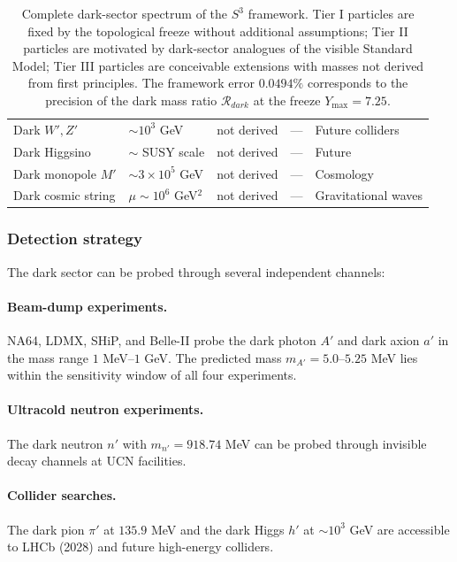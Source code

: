 \documentclass[12pt,oneside,openany]{book}
\begin{document}
\begin{table}[htbp]
\begin{tabular}{@{}p{}p{}p{}p{}p{}@{}}
Dark $W', Z'$      & $\sim 10^{3}$ GeV& not derived & ---           & Future colliders \\
Dark Higgsino      & $\sim$ SUSY scale& not derived & ---           & Future \\
Dark monopole $M'$ & $\sim 3\times 10^{5}$ GeV & not derived & --- & Cosmology \\
Dark cosmic string & $\mu\sim 10^{6}$ GeV$^{2}$ & not derived & --- & Gravitational waves \\
\bottomrule
\end{tabular}
\caption{Complete dark-sector spectrum of the $S^{3}$ framework.
Tier I particles are fixed by the topological freeze without
additional assumptions; Tier II particles are motivated by
dark-sector analogues of the visible Standard Model; Tier III
particles are conceivable extensions with masses not derived
from first principles. The framework error $0.0494\%$ corresponds
to the precision of the dark mass ratio $\mathcal{R}_{dark}$ at
the freeze $Y_{\max}=7.25$.}
\label{tab:dark-spectrum}
\end{table}

\subsubsection{Detection strategy}

The dark sector can be probed through several independent
channels:

\paragraph{Beam-dump experiments.}
NA64, LDMX, SHiP, and Belle-II probe the dark photon $A'$ and
dark axion $a'$ in the mass range $1$ MeV--$1$ GeV. The
predicted mass $m_{A'}=5.0$--$5.25$ MeV lies within the
sensitivity window of all four experiments.

\paragraph{Ultracold neutron experiments.}
The dark neutron $n'$ with $m_{n'}=918.74$ MeV can be probed
through invisible decay channels at UCN facilities.

\paragraph{Collider searches.}
The dark pion $\pi'$ at $135.9$ MeV and the dark Higgs $h'$ at
$\sim 10^{3}$ GeV are accessible to LHCb (2028) and future
high-energy colliders.
\end{document}
